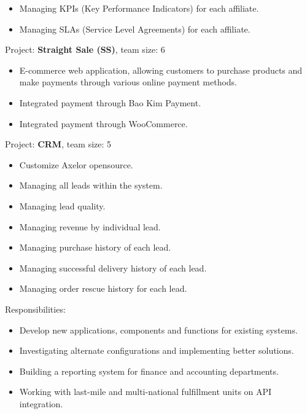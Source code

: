{\begin{cvitems}
{\begin{itemize}
                \item { Managing KPIs (Key Performance Indicators) for each affiliate. }
                \item { Managing SLAs (Service Level Agreements) for each affiliate. }
            \end{itemize}
        }
        \item { Project: \textbf{Straight Sale (SS)}, team size: 6 }
        {
            \begin{itemize}
                \item { E-commerce web application, allowing customers to purchase products and make payments through various online payment methods. }
                \item { Integrated payment through Bao Kim Payment. }
                \item { Integrated payment through WooCommerce. }
            \end{itemize}
        }
        \item { Project: \textbf{CRM}, team size: 5 }
        {
            \begin{itemize}
                \item { Customize Axelor opensource. }
                \item { Managing all leads within the system. }
                \item { Managing lead quality. }
                \item { Managing revenue by individual lead. }
                \item { Managing purchase history of each lead. }
                \item { Managing successful delivery history of each lead. }
                \item { Managing order rescue history for each lead. }
            \end{itemize}
        }
        \item {Responsibilities: }
        {
            \begin{itemize} %
                \item { Develop new applications, components and functions for existing systems. }
                \item { Investigating alternate configurations and implementing better solutions. }
                \item { Building a reporting system for finance and accounting departments. }
                \item { Working with last-mile and multi-national fulfillment units on API integration. }

\end{itemize}}
\end{cvitems}}
